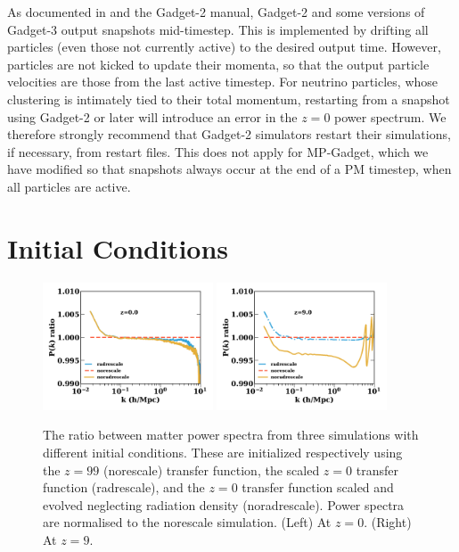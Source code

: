 \documentclass[useAMS, usenatbib]{mnras}
\begin{document}
As documented in \cite{Springel_2005} and the Gadget-2 manual, Gadget-2 and some versions of Gadget-3 output snapshots mid-timestep. This is implemented by drifting all particles (even those not currently active) to the desired output time. However, particles are not kicked to update their momenta, so that the output particle velocities are those from the last active timestep. For neutrino particles, whose clustering is intimately tied to their total momentum, restarting from a snapshot using Gadget-2 or later will introduce an error in the $z=0$ power spectrum. We therefore strongly recommend that Gadget-2 simulators restart their simulations, if necessary, from restart files. This does not apply for MP-Gadget, which we have modified so that snapshots always occur at the end of a PM timestep, when all particles are active.

\section{Initial Conditions}
\label{sec:initcond}

\begin{figure}
\includegraphics[width=0.45\textwidth]{icplots/pks_rel-1.pdf}
\includegraphics[width=0.45\textwidth]{icplots/pks_rel-0_1.pdf}
  \caption{The ratio between matter power spectra from three simulations with different initial conditions.
  These are initialized respectively using the $z=99$ (norescale) transfer function,
  the scaled $z=0$ transfer function (radrescale), and the $z=0$ transfer function
  scaled and evolved neglecting radiation density (noradrescale). Power spectra are normalised to the norescale simulation.
  (Left) At $z=0$. (Right) At $z=9$.}
  \label{fig:rescaling}
\end{figure}
\end{document}
